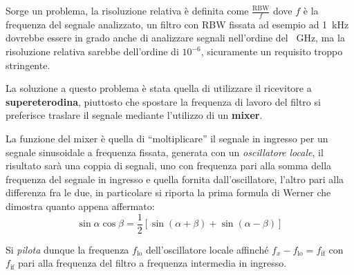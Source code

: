 Sorge un problema, la risoluzione relativa è definita come $\frac{\text{RBW}}{f} $
dove $f$ è la frequenza del segnale analizzato, un filtro con RBW fissata ad esempio 
ad \SI{1}{\kilo\hertz} dovrebbe essere in grado anche di 
analizzare segnali nell'ordine del \SI{}{\giga\hertz}, ma la risoluzione relativa
sarebbe dell'ordine di $10^{-6}$, sicuramente un requisito troppo stringente.

La soluzione a questo problema è stata quella di utilizzare il ricevitore
a \textbf{supereterodina}, piuttosto che spostare la frequenza di lavoro del filtro 
si preferisce traslare il segnale mediante l'utilizzo di un \textbf{mixer}.

La funzione del mixer è quella di ``moltiplicare'' il segnale in ingresso
per un segnale sinusoidale a frequenza fissata, generata con 
un \textit{oscillatore locale},
il risultato sarà una coppia di segnali,
uno con frequenza pari alla somma della frequenza del segnale in ingresso e quella
fornita dall'oscillatore, l'altro pari alla differenza fra le due,
in particolare si riporta la prima formula di Werner che dimostra quanto 
appena affermato:
$$
\sin\alpha\cos\beta = \frac{1}{2} \left[\sin(\alpha+\beta)+\sin(\alpha-\beta)\right]
$$

Si \textit{pilota} dunque la frequenza $f_{\text{lo}}$ dell'oscillatore locale
affinché $f_x - f_{\text{lo}} = f_{\text{if}}$ con $f_{\text{if}}$ pari alla
frequenza del filtro a frequenza intermedia in ingresso.

